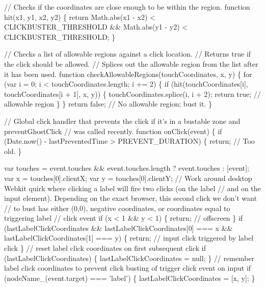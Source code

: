 \begin{DoxyCodeInclude}
  \textcolor{comment}{// Checks if the coordinates are close enough to be within the region.}
  \textcolor{keyword}{function} hit(x1, y1, x2, y2) \{
    \textcolor{keywordflow}{return} Math.abs(x1 - x2) < CLICKBUSTER\_THRESHOLD && Math.abs(y1 - y2) < CLICKBUSTER\_THRESHOLD;
  \}

  \textcolor{comment}{// Checks a list of allowable regions against a click location.}
  \textcolor{comment}{// Returns true if the click should be allowed.}
  \textcolor{comment}{// Splices out the allowable region from the list after it has been used.}
  \textcolor{keyword}{function} checkAllowableRegions(touchCoordinates, x, y) \{
    \textcolor{keywordflow}{for} (var i = 0; i < touchCoordinates.length; i += 2) \{
      \textcolor{keywordflow}{if} (hit(touchCoordinates[i], touchCoordinates[i + 1], x, y)) \{
        touchCoordinates.splice(i, i + 2);
        \textcolor{keywordflow}{return} \textcolor{keyword}{true}; \textcolor{comment}{// allowable region}
      \}
    \}
    \textcolor{keywordflow}{return} \textcolor{keyword}{false}; \textcolor{comment}{// No allowable region; bust it.}
  \}

  \textcolor{comment}{// Global click handler that prevents the click if it's in a bustable zone and preventGhostClick}
  \textcolor{comment}{// was called recently.}
  \textcolor{keyword}{function} onClick(event) \{
    \textcolor{keywordflow}{if} (Date.now() - lastPreventedTime > PREVENT\_DURATION) \{
      \textcolor{keywordflow}{return}; \textcolor{comment}{// Too old.}
    \}

    var touches = \textcolor{keyword}{event}.touches && \textcolor{keyword}{event}.touches.length ? \textcolor{keyword}{event}.touches : [event];
    var x = touches[0].clientX;
    var y = touches[0].clientY;
    \textcolor{comment}{// Work around desktop Webkit quirk where clicking a label will fire two clicks (on the label}
    \textcolor{comment}{// and on the input element). Depending on the exact browser, this second click we don't want}
    \textcolor{comment}{// to bust has either (0,0), negative coordinates, or coordinates equal to triggering label}
    \textcolor{comment}{// click event}
    \textcolor{keywordflow}{if} (x < 1 && y < 1) \{
      \textcolor{keywordflow}{return}; \textcolor{comment}{// offscreen}
    \}
    \textcolor{keywordflow}{if} (lastLabelClickCoordinates &&
        lastLabelClickCoordinates[0] === x && lastLabelClickCoordinates[1] === y) \{
      \textcolor{keywordflow}{return}; \textcolor{comment}{// input click triggered by label click}
    \}
    \textcolor{comment}{// reset label click coordinates on first subsequent click}
    \textcolor{keywordflow}{if} (lastLabelClickCoordinates) \{
      lastLabelClickCoordinates = null;
    \}
    \textcolor{comment}{// remember label click coordinates to prevent click busting of trigger click event on input}
    \textcolor{keywordflow}{if} (nodeName\_(event.target) === \textcolor{stringliteral}{'label'}) \{
      lastLabelClickCoordinates = [x, y];
    \}


\end{DoxyCodeInclude}
